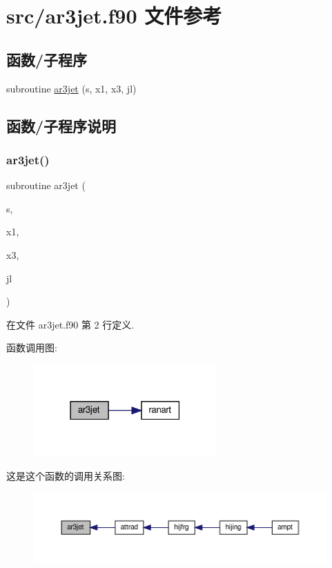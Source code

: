 \hypertarget{ar3jet_8f90}{}\section{src/ar3jet.f90 文件参考}
\label{ar3jet_8f90}
\subsection*{函数/子程序}
\begin{DoxyCompactItemize}
\item 
subroutine \mbox{\hyperlink{ar3jet_8f90_acf06795f120da0b37c0dd6f74711193d}{ar3jet}} (s, x1, x3, jl)
\end{DoxyCompactItemize}


\subsection{函数/子程序说明}
\mbox{\label{ar3jet_8f90_acf06795f120da0b37c0dd6f74711193d}} 
\subsubsection{\texorpdfstring{ar3jet()}{ar3jet()}}
{\footnotesize\ttfamily subroutine ar3jet (\begin{DoxyParamCaption}\item[{}]{s,  }\item[{}]{x1,  }\item[{}]{x3,  }\item[{}]{jl }\end{DoxyParamCaption})}



在文件 ar3jet.\+f90 第 2 行定义.

函数调用图\+:
\nopagebreak
\begin{figure}[H]
\begin{center}
\leavevmode
\includegraphics[width=198pt]{ar3jet_8f90_acf06795f120da0b37c0dd6f74711193d_cgraph}
\end{center}
\end{figure}
这是这个函数的调用关系图\+:
\nopagebreak
\begin{figure}[H]
\begin{center}
\leavevmode
\includegraphics[width=350pt]{ar3jet_8f90_acf06795f120da0b37c0dd6f74711193d_icgraph}
\end{center}
\end{figure}
